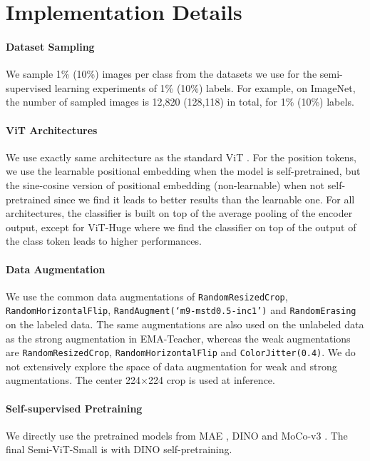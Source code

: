 \documentclass{article}
\begin{document}
{
\small


}




\newpage
\appendix


\section{Implementation Details}

\paragraph{Dataset Sampling} We sample 1\% (10\%) images per class from the datasets we use for the semi-supervised learning experiments of 1\% (10\%) labels. For example, on ImageNet, the number of sampled images is 12,820 (128,118) in total, for 1\% (10\%) labels.


\paragraph{ViT Architectures} We use exactly same architecture as the standard ViT \cite{DBLP:conf/iclr/DosovitskiyB0WZ21}. For the position tokens, we use the learnable positional embedding when the model is self-pretrained, but the sine-cosine version of positional embedding (non-learnable) when not self-pretrained since we find it leads to better results than the learnable one. For all architectures, the classifier is built on top of the average pooling of the encoder output, except for ViT-Huge where we find the classifier on top of the output of the class token leads to higher performances.

\paragraph{Data Augmentation}
We use the common data augmentations of \texttt{RandomResizedCrop}, \texttt{RandomHorizontalFlip}, \texttt{RandAugment(`m9-mstd0.5-inc1')} \cite{DBLP:conf/nips/CubukZS020} and \texttt{RandomErasing} \cite{DBLP:conf/aaai/Zhong0KL020} on the labeled data. The same augmentations are also used on the unlabeled data as the strong augmentation in EMA-Teacher, whereas the weak augmentations are  \texttt{RandomResizedCrop}, \texttt{RandomHorizontalFlip} and \texttt{ColorJitter(0.4)}. We do not extensively explore the space of data augmentation for weak and strong augmentations. The center 224$\times$224 crop is used at inference.

\paragraph{Self-supervised Pretraining} We directly use the pretrained models from MAE \cite{he2021masked}, DINO \cite{DBLP:conf/iccv/ChenXH21} and MoCo-v3 \cite{DBLP:conf/iccv/CaronTMJMBJ21}. The final Semi-ViT-Small is with DINO self-pretraining.
\end{document}
